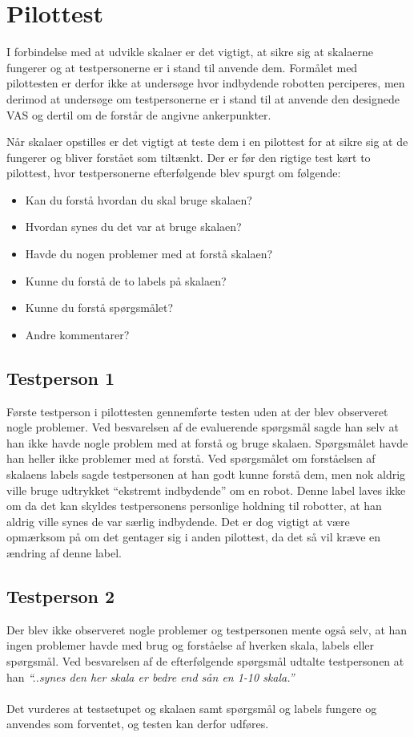 \section*{Pilottest}
\label{pilottest}
%
I forbindelse med at udvikle skalaer er det vigtigt, at sikre sig at skalaerne fungerer og at testpersonerne er i stand til anvende dem. Formålet med pilottesten er derfor ikke at undersøge hvor indbydende robotten perciperes, men derimod at undersøge om testpersonerne er i stand til at anvende den designede VAS og dertil om de forstår de angivne ankerpunkter. 


Når skalaer opstilles er det vigtigt at teste dem i en pilottest for at sikre sig at de fungerer og bliver forstået som tiltænkt. Der er før den rigtige test kørt to pilottest, hvor testpersonerne efterfølgende blev spurgt om følgende:\blankline
%
\begin{itemize}
	\item Kan du forstå hvordan du skal bruge skalaen?
	\item Hvordan synes du det var at bruge skalaen?
	\item Havde du nogen problemer med at forstå skalaen?
	\item Kunne du forstå de to labels på skalaen?
	\item Kunne du forstå spørgsmålet?
	\item Andre kommentarer?
\end{itemize} 

\subsection*{Testperson 1}
Første testperson i pilottesten gennemførte testen uden at der blev observeret nogle problemer. Ved besvarelsen af de evaluerende spørgsmål sagde han selv at han ikke havde nogle problem med at forstå og bruge skalaen. Spørgsmålet havde han heller ikke problemer med at forstå. 
Ved spørgsmålet om forståelsen af skalaens labels sagde testpersonen at han godt kunne forstå dem, men nok aldrig ville bruge udtrykket ``ekstremt indbydende'' om en robot. Denne label laves ikke om da det kan skyldes testpersonens personlige holdning til robotter, at han aldrig ville synes de var særlig indbydende. Det er dog vigtigt at være opmærksom på om det gentager sig i anden pilottest, da det så vil kræve en ændring af denne label.

\subsection*{Testperson 2}
Der blev ikke observeret nogle problemer og testpersonen mente også selv, at han ingen problemer havde med brug og forståelse af hverken skala, labels eller spørgsmål. Ved besvarelsen af de efterfølgende spørgsmål udtalte testpersonen at han \textit{``..synes den her skala er bedre end sån en 1-10 skala.''}
\\\\
Det vurderes at testsetupet og skalaen samt spørgsmål og labels fungere og anvendes som forventet, og testen kan derfor udføres. 